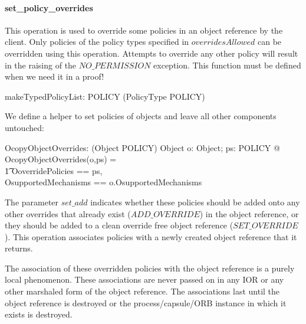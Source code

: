 


\paragraph{set\_policy\_overrides}
This operation is used to override some policies in an object reference by the
client.  Only policies of the policy types specified in $overridesAllowed$ can
be overridden using this operation.  Attempts to override any other policy will
result in the raising of the $NO\_PERMISSION$ exception.
This function must be defined when we need it in a proof!
\begin{axdef}
  makeTypedPolicyList: \power POLICY \pfun \power (PolicyType \cross POLICY) \\
\end{axdef}
We define a helper to set policies of objects and leave all other components
untouched: 
\begin{axdef}
  OcopyObjectOverrides: (Object \cross \power POLICY) \fun Object
  \where
  \forall o: Object; ps: \power POLICY @ OcopyObjectOverrides(o,ps) = \\
  \t1 \lbind \< OoverridePolicies == ps, \\
  OsupportedMechanisms == o.OsupportedMechanisms \rbind \>
\end{axdef}
The parameter $set\_add$ indicates whether these policies should be added onto
any other overrides that already exist ($ADD\_OVERRIDE$) in the object
reference, or they should be added to a clean override free object reference
($SET\_OVERRIDE$). This operation associates policies with a newly created
object reference that it returns.

The association of these overridden policies with the object reference is a
purely local phenomenon. These associations are never passed on in any IOR or
any other marshaled form of the object reference. The associations last until
the object reference is destroyed or the process/capsule/ORB instance in which
it exists is destroyed.

